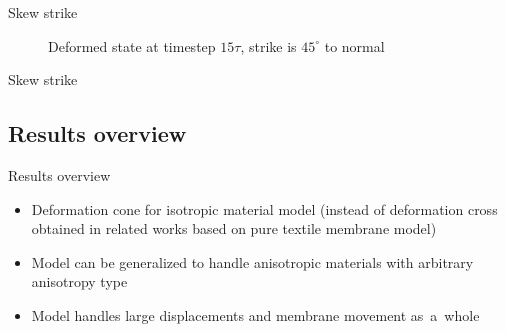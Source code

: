 \documentclass[10pt]{beamer}
\numberwithin{equation}{subsection}
\begin{document}
\begin{frame}{Skew strike}
    \begin{minipage}{0.6\textwidth}
        \begin{figure}\label{norm15tau}
    	\noindent{}
        \caption{Deformed state at timestep $15\tau$, strike is $45^\circ$ to normal}
	\end{figure}
    \end{minipage}
    \hfill
    \begin{minipage}{0.35\textwidth}
    
    \end{minipage}
\end{frame}

\begin{frame}{Skew strike}
\end{frame}


\subsection{Results overview}
\begin{frame}{Results overview}
    \begin{itemize}
        \item Deformation cone for isotropic material model (instead of deformation cross obtained in related works based on pure textile membrane model)
        \item Model can be generalized to handle anisotropic materials with arbitrary anisotropy type
        \item Model handles large displacements and membrane movement as~a~whole
    \end{itemize}
\end{frame}
\end{document}
